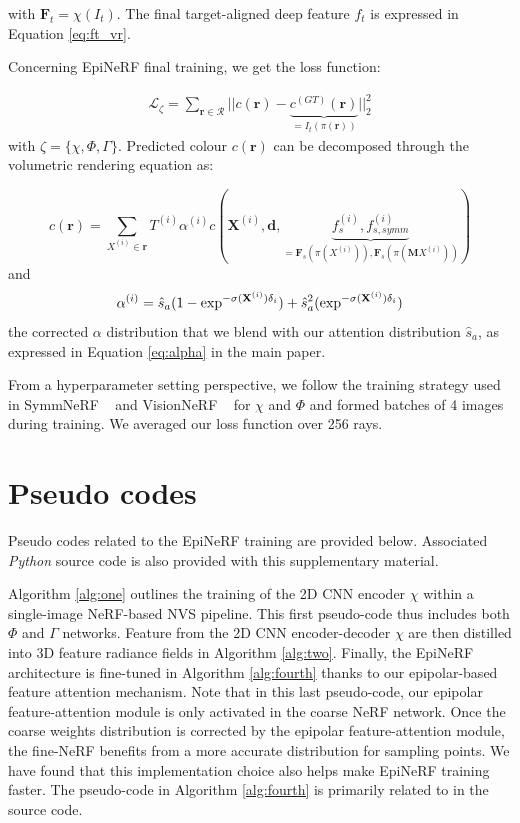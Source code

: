 with $\mathbf{F}_{t} = \chi(I_{t})$. The final target-aligned deep feature $f_{t}$ is expressed in Equation \ref{eq:ft_vr}. \newline

Concerning EpiNeRF final training, we get the loss function: 

\begin{equation}
\begin{split}
 \mathcal{L}_{\zeta}= \sum_{\mathbf{r}\in\mathcal{R}} || c(\mathbf{r}) - \underbrace{c^{(GT)}(\mathbf{r})}_{= I_{t}(\pi(\mathbf{r}))} ||_{2}^{2}
\end{split}
\end{equation}
with $\zeta = \{\chi,\Phi,\Gamma\}$. Predicted colour $c(\mathbf{r})$ can be decomposed through the volumetric rendering equation as: 

\begin{equation}
c(\mathbf{r}) = \sum_{X^{(i)} \in \mathbf{r}}T^{(i)}\alpha^{(i)}c(\mathbf{X}^{(i)},\mathbf{d},\underbrace{f_{s}^{(i)},f_{s,symm}^{(i)}}_{= \mathbf{F}_{s}(\pi(X^{(i)})), \mathbf{F}_{s}(\pi(\mathbf{M}X^{(i)}))})
\end{equation}
and
\begin{equation}
\alpha^{(i)} = \hat{s}_{a}(1-\exp^{-\sigma(\mathbf{X}^{(i)})\delta_{i}}) + \hat{s}_{a}^{2}(\exp^{-\sigma(\mathbf{X}^{(i)})\delta_{i}}) \\
\end{equation}
the corrected $\alpha$ distribution that we blend with our attention distribution $\hat{s}_{a}$, as expressed in Equation \ref{eq:alpha} in the main paper. 

From a hyperparameter setting perspective, we follow the training strategy used in  SymmNeRF ~\cite{li2022symmnerf} and VisionNeRF ~\cite{lin2023vision} for $\chi$ and $\Phi$ and formed batches of 4 images during training. We averaged our loss function over 256 rays.

\section{Pseudo codes}

Pseudo codes related to the EpiNeRF training are provided below. Associated \textit{Python} source code is also provided with this supplementary material. 

Algorithm \ref{alg:one} outlines the training of the 2D CNN encoder $\chi$ within a single-image NeRF-based NVS pipeline. This first pseudo-code thus includes both $\Phi$ and $\Gamma$ networks. Feature from the 2D CNN encoder-decoder $\chi$ are then distilled into 3D feature radiance fields in Algorithm \ref{alg:two}. Finally, the EpiNeRF architecture is fine-tuned in Algorithm \ref{alg:fourth} thanks to our epipolar-based feature attention mechanism. Note that in this last pseudo-code, our epipolar feature-attention module is only activated in the coarse NeRF network. Once the coarse weights distribution is corrected by the epipolar feature-attention module, the fine-NeRF benefits from a more accurate distribution for sampling points. We have found that this implementation choice also helps make EpiNeRF training faster. The pseudo-code in Algorithm \ref{alg:fourth} is primarily related to  in the source code.

